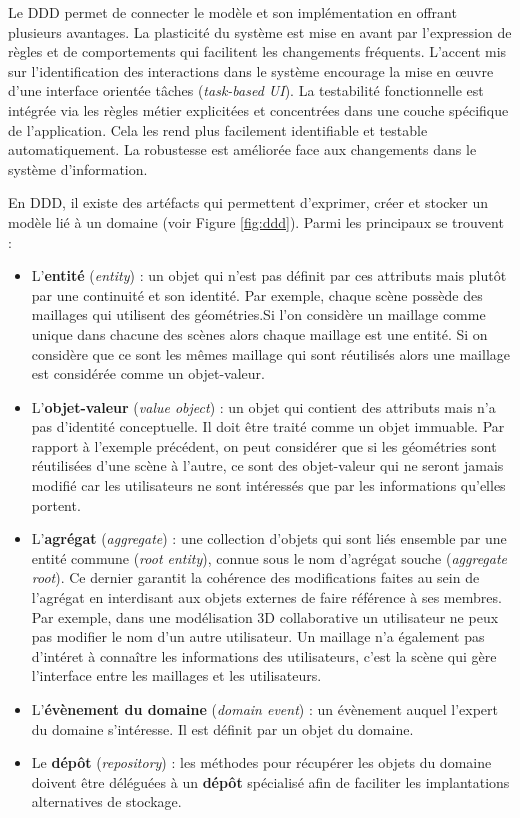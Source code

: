 Le \gls{DDD} permet de connecter le modèle et son implémentation en offrant 
plusieurs avantages. La plasticité du système est mise en avant par l'expression 
de règles et de comportements qui facilitent les changements fréquents.
L'accent mis sur l'identification des interactions dans le système encourage la 
mise en \oe{}uvre d'une interface orientée tâches (\textit{task-based UI}).
La testabilité fonctionnelle est intégrée via les règles métier explicitées 
et concentrées dans une couche spécifique de l'application. Cela les rend 
plus facilement identifiable et testable automatiquement.
La robustesse est améliorée face aux changements dans le système d'information.

En \gls{DDD}, il existe des artéfacts qui permettent d'exprimer, créer et stocker un 
modèle lié à un domaine (voir Figure \ref{fig:ddd}). Parmi les principaux se trouvent 
:
\begin{itemize}
	\item L'\textbf{entité} (\textit{entity}) : un objet qui n'est pas définit par ces 
	attributs 
	mais plutôt par une continuité et son identité. 
	Par exemple, chaque scène possède des maillages qui utilisent des 
	géométries.Si l'on 
	considère un maillage comme unique dans chacune des scènes alors chaque 
	maillage est une entité. Si on considère que ce sont les mêmes maillage qui 
	sont réutilisés alors une maillage est considérée comme un objet-valeur.
	
	\item L'\textbf{objet-valeur} (\textit{value object}) : un objet qui contient des 
	attributs 
	mais n'a pas d'identité conceptuelle. Il doit être traité comme un objet
	immuable. Par rapport à l'exemple précédent, on peut considérer que si les 
	géométries sont réutilisées d'une scène à l'autre, ce sont des objet-valeur qui 
	ne seront jamais modifié car les utilisateurs ne sont intéressés que par les 
	informations qu'elles portent.
	
	\item L'\textbf{agrégat} (\textit{aggregate}) : une collection d'objets qui sont 
	liés 
	ensemble par une entité commune (\textit{root entity}), connue sous le nom 
	d'agrégat souche (\textit{aggregate root}). Ce dernier garantit la cohérence des 
	modifications faites au sein de l'agrégat en interdisant aux objets externes de 
	faire référence à ses membres. Par exemple, dans une modélisation 3D 
	collaborative un utilisateur ne peux pas modifier le nom d'un autre utilisateur. Un 
	maillage n'a également pas d'intéret à connaître les informations des 
	utilisateurs, c'est la scène qui gère l'interface entre les maillages et les 
	utilisateurs.
	\item L'\textbf{évènement du domaine} (\textit{domain event}) : un 
	évènement auquel 
	l'expert du domaine s'intéresse. Il est définit par un objet du domaine.
	\item Le \textbf{dépôt} (\textit{repository}) : les méthodes pour récupérer les 
	objets du domaine doivent être déléguées à un \textbf{dépôt} spécialisé afin de 
	faciliter les implantations 
	alternatives de stockage.
\end{itemize}



